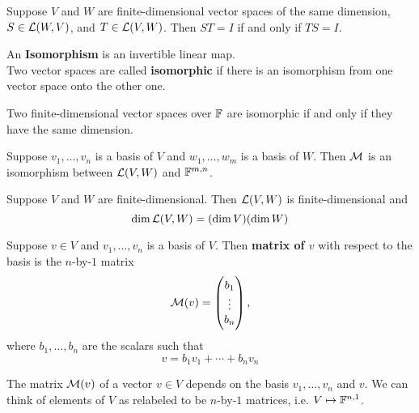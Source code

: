 \documentclass{extarticle}
\begin{document}
\begin{corollary}
    Suppose \(V\) and \(W\) are finite-dimensional vector spaces of the same dimension, \(S \in 
    \mathcal{L}(W, V)\), and \(T \in \mathcal{L}(V, W)\). Then \(ST = I\) if and only if \(TS = I\). 
\end{corollary}

\begin{definition}[Isomorphism]
    An \textbf{Isomorphism} is an invertible linear map. \\ 
    Two vector spaces are called \textbf{isomorphic} if there is an isomorphism from one vector space 
    onto the other one. 
\end{definition}

\begin{thm}
    Two finite-dimensional vector spaces over \(\mathbb{F}\) are isomorphic if and only if they have 
    the same dimension. 
\end{thm}

\begin{thm}
    Suppose \(v_1, \ldots, v_n\) is a basis of \(V\) and \(w_1, \ldots, w_m\) is a basis of \(W\). 
    Then \(\mathcal{M}\) is an isomorphism between \(\mathcal{L}(V, W)\) and \(\mathbb{F}^{m, n}\). 
\end{thm}

\begin{corollary}
    Suppose \(V\) and \(W\) are finite-dimensional. Then \(\mathcal{L}(V, W)\) is finite-dimensional and 
    \[\dim \mathcal{L}(V, W) = (\dim V) (\dim W)\]
\end{corollary}

\begin{definition}
    Suppose \(v \in V\) and \(v_1, \ldots, v_n\) is a basis of \(V\). Then \textbf{matrix of \(v\)} 
    with respect to the basis is the \(n\)-by-\(1\) matrix 
    \[\mathcal{M}(v) = \begin{pmatrix}
        b_1 \\ 
        \vdots \\ 
        b_n
    \end{pmatrix},\]
    where \(b_1, \ldots, b_n\) are the scalars such that 
    \[v = b_1 v_1 + \cdots + b_n v_n\] 
\end{definition}

\begin{remark}
    The matrix \(\mathcal{M}(v)\) of a vector \(v \in V\) depends on the basis \(v_1, \ldots, v_n\) and \(v\). We 
    can think of elements of \(V\) as relabeled to be \(n\)-by-\(1\) matrices, i.e. \(V \mapsto \mathbb{F}^{n , 1}\).
\end{remark}
\end{document}
